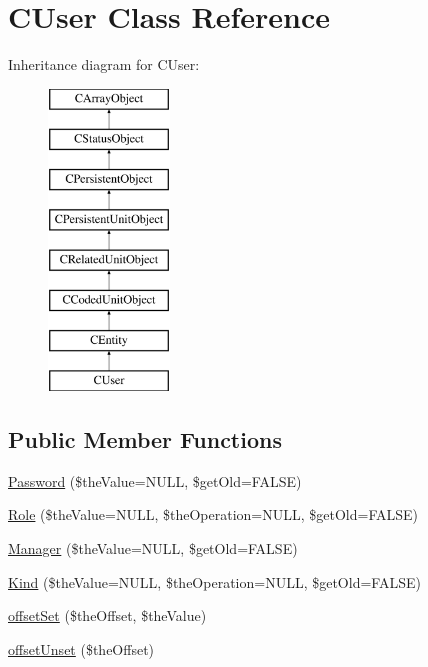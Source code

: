 \hypertarget{class_c_user}{\section{C\-User Class Reference}
\label{class_c_user}
}
Inheritance diagram for C\-User\-:\begin{figure}[H]
\begin{center}
\leavevmode
\includegraphics[height=8.000000cm]{class_c_user}
\end{center}
\end{figure}
\subsection*{Public Member Functions}
\begin{DoxyCompactItemize}
\item 
\hyperlink{class_c_user_a0e6f1cf51ad23f971ed0999f8d248c8d}{Password} (\$the\-Value=N\-U\-L\-L, \$get\-Old=F\-A\-L\-S\-E)
\item 
\hyperlink{class_c_user_add1faba1d336cf4b610a632d3c376dd2}{Role} (\$the\-Value=N\-U\-L\-L, \$the\-Operation=N\-U\-L\-L, \$get\-Old=F\-A\-L\-S\-E)
\item 
\hyperlink{class_c_user_acd45e0c231f54e7ccc452cb6bcd3aa35}{Manager} (\$the\-Value=N\-U\-L\-L, \$get\-Old=F\-A\-L\-S\-E)
\item 
\hyperlink{class_c_user_aff35c01690c6cfa3c58954c78f597316}{Kind} (\$the\-Value=N\-U\-L\-L, \$the\-Operation=N\-U\-L\-L, \$get\-Old=F\-A\-L\-S\-E)
\item 
\hyperlink{class_c_user_aace3446b9cacfe28cc1937c608fcc999}{offset\-Set} (\$the\-Offset, \$the\-Value)
\item 
\hyperlink{class_c_user_aed8557e18a89d868cedf5a48328b33b2}{offset\-Unset} (\$the\-Offset)
\end{DoxyCompactItemize}

